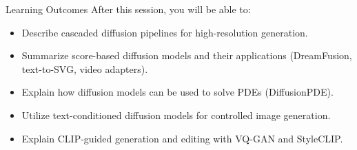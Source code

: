 \begin{frame}{Learning Outcomes}
After this session, you will be able to:
\begin{itemize}
    \item Describe cascaded diffusion pipelines for high-resolution generation.
    \item Summarize score-based diffusion models and their applications (DreamFusion, text-to-SVG, video adapters).
    \item Explain how diffusion models can be used to solve PDEs (DiffusionPDE).
    \item Utilize text-conditioned diffusion models for controlled image generation.
    \item Explain CLIP-guided generation and editing with VQ-GAN and StyleCLIP.
\end{itemize}
\end{frame}
